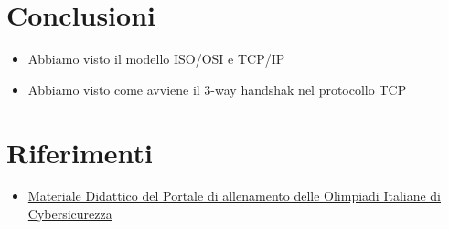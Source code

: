 \documentclass{beamer}
\begin{document}
\section{Conclusioni}
\begin{frame}{\insertsection}
\begin{itemize}
\item Abbiamo visto il modello ISO/OSI e TCP/IP
\item Abbiamo visto come avviene il 3-way handshak nel protocollo TCP
\end{itemize}
\end{frame}

\section{Riferimenti}
\begin{frame}{\insertsection}
\begin{itemize}
\item \href{https://training.olicyber.it/training}{Materiale Didattico del Portale di allenamento delle Olimpiadi Italiane di Cybersicurezza} 
\end{itemize}
\end{frame}
\end{document}
